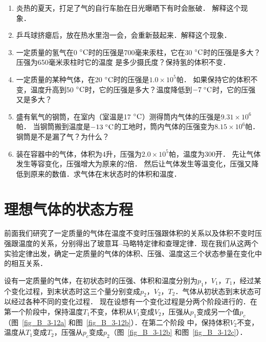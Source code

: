 \begin{enumerate}
    \item 炎热的夏天，打足了气的自行车胎在日光曝晒下有时会胀破．
    解释这个现象．
\item 乒乓球挤瘪后，放在热水里泡一会，会重新鼓起来．解释这个现象．
\item 一定质量的氢气在0$\;{}^\circ\text{C}$时的压强是700毫来汞柱，它在30$\;{}^\circ\text{C}$时的压强是多大？压强为650毫米汞柱时它的温度
是多少摄氏度？保持氢的体积不变．
\item 一定质量的某种气体，在20$\;{}^\circ\text{C}$时的压强是$1.0\times 10^5$帕．
如果保持它的体积不变，温度升高到50$\;{}^\circ\text{C}$时，它的压强是多大？温度降低到$-7 \;{}^\circ\text{C} $时，它的压强又是多大？
\item 盛有氧气的钢筒，在室内（室温是17$\;{}^\circ\text{C}$）测得筒内气体的压强是$9.31\times 10^6$帕．
当钢筒搬到温度是$-13 \;{}^\circ\text{C}$的工地时，筒内气体的压强变为$8.15\times 10^6$帕．钢筒是不是漏了气？为什么？
\item 装在容器中的气体，体积为4升，压强为$2.0\times 10^5$帕，温度为300开．
先让气体发生等容变化，压强增大为原来的2倍．
然后让气体发生等温变化，压强又降低到原来的数值．求气体在末状态时的体积和温度．

\end{enumerate}

\section{理想气体的状态方程}
前面我们研究了一定质量的气体在温度不变时压强跟体积的关系以及体积不变时压强跟温度的关系，分别得出了玻意耳--马略特定律和查理定律．现在我们从这两个实验定律出发，确定一定质量的气体的体积、压强、温度这三个状态参量在变化中的相互关系．

设有一定质量的气体，在初状态时的压强、体积和温度分别为$p_1 $，$ V_1 $，$ T_1$，经过某个变化过程，到末状态时这三个量分别变成$p_2 $，$ V_2 $，$ T_2$．气体从初状态到末状态可以经过各种不同的变化过程．
现在设想有一个变化过程是分两个阶段进行的．在第一个阶段中，保持温度$T_1$不变，体积从$V_1$变成$V_2$，压强从$p_1$变成另一个值$p_c$（图~\ref{fig_B_3-12a} 和图~\ref{fig_B_3-12b}）．在第二个阶段
中，保持体积$V_2$不变，温度从$T_1$变成$T_2$，压强从$p_c$变成$p_2$（图~\ref{fig_B_3-12b} 和图~\ref{fig_B_3-12c}）．

